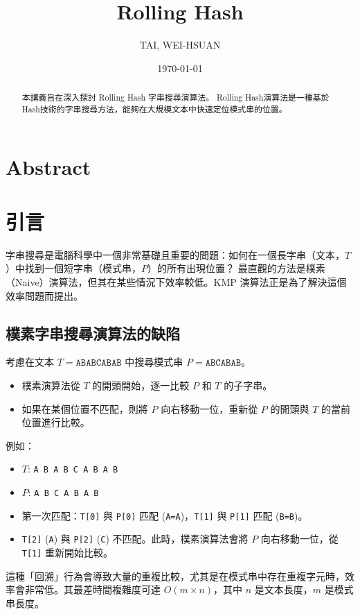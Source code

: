 \documentclass[12pt,a4paper]{article}
\title{Rolling Hash}
\author{TAI, WEI-HSUAN}
\date{\today}
\begin{document}
\maketitle

\newpage
\tableofcontents
\newpage

\section*{Abstract}

\begin{abstract}
本講義旨在深入探討 Rolling Hash 字串搜尋演算法。
Rolling Hash演算法是一種基於Hash技術的字串搜尋方法，能夠在大規模文本中快速定位模式串的位置。
\end{abstract}

\section{引言}
字串搜尋是電腦科學中一個非常基礎且重要的問題：如何在一個長字串（文本，$T$）中找到一個短字串（模式串，$P$）的所有出現位置？
最直觀的方法是樸素（Naive）演算法，但其在某些情況下效率較低。KMP 演算法正是為了解決這個效率問題而提出。

\subsection{樸素字串搜尋演算法的缺陷}
考慮在文本 $T = \texttt{ABABCABAB}$ 中搜尋模式串 $P = \texttt{ABCABAB}$。
\begin{itemize}
    \item 樸素演算法從 $T$ 的開頭開始，逐一比較 $P$ 和 $T$ 的子字串。
    \item 如果在某個位置不匹配，則將 $P$ 向右移動一位，重新從 $P$ 的開頭與 $T$ 的當前位置進行比較。
\end{itemize}

例如：
\begin{itemize}
    \item $T$: \verb|A B A B C A B A B|
    \item $P$: \verb|A B C A B A B|
    \item 第一次匹配：\verb|T[0]| 與 \verb|P[0]| 匹配 (\verb|A=A|)，\verb|T[1]| 與 \verb|P[1]| 匹配 (\verb|B=B|)。
    \item \verb|T[2]| (\verb|A|) 與 \verb|P[2]| (\verb|C|) 不匹配。此時，樸素演算法會將 $P$ 向右移動一位，從 \verb|T[1]| 重新開始比較。
\end{itemize}
這種「回溯」行為會導致大量的重複比較，尤其是在模式串中存在重複字元時，效率會非常低。其最差時間複雜度可達 $O(m \times n)$，其中 $n$ 是文本長度，$m$ 是模式串長度。
\end{document}

